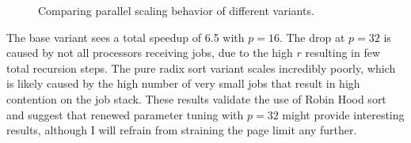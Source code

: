 \documentclass[a4paper,UKenglish,cleveref, autoref, thm-restate]{template/lipics-v2021}
\begin{document}
	\begin{figure}[h]
		\centering
		\caption{Comparing parallel scaling behavior of different variants.}
		\label{fig:par}
	\end{figure}
	
	The base variant sees a total speedup of 6.5 with $p=16$.
	The drop at $p=32$ is caused by not all processors receiving jobs, due to the high $r$ resulting in few total recursion steps.
	The pure radix sort variant scales incredibly poorly, which is likely caused by the high number of very small jobs that result in high contention on the job stack.
	These results validate the use of Robin Hood sort and suggest that renewed parameter tuning with $p=32$ might provide interesting results, although I will refrain from straining the page limit any further.

	\appendix
	
\end{document}
